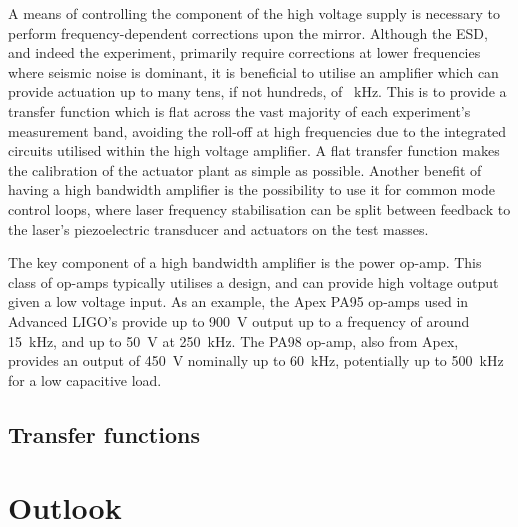 A means of controlling the \ac{} component of the high voltage supply is necessary to perform frequency-dependent corrections upon the mirror. Although the ESD, and indeed the \SSM{} experiment, primarily require corrections at lower frequencies where seismic noise is dominant, it is beneficial to utilise an amplifier which can provide actuation up to many tens, if not hundreds, of \SI{}{\kilo\hertz}. This is to provide a transfer function which is flat across the vast majority of each experiment's measurement band, avoiding the roll-off at high frequencies due to the integrated circuits utilised within the high voltage amplifier. A flat transfer function makes the calibration of the actuator plant as simple as possible. Another benefit of having a high bandwidth amplifier is the possibility to use it for common mode control loops, where laser frequency stabilisation can be split between feedback to the laser's piezoelectric transducer and actuators on the test masses.

The key component of a high bandwidth amplifier is the power op-amp. This class of op-amps typically utilises a \MOSFET design, and can provide high voltage output given a low voltage input. As an example, the Apex PA95 op-amps used in Advanced LIGO's \ESDs provide up to \SI{900}{\volt} output up to a frequency of around \SI{15}{\kilo\hertz}, and up to \SI{50}{\volt} at \SI{250}{\kilo\hertz}. The PA98 op-amp, also from Apex, provides an output of \SI{450}{\volt} nominally up to \SI{60}{\kilo\hertz}, potentially up to \SI{500}{\kilo\hertz} for a low capacitive load.


\subsection{Transfer functions}

\section{Outlook}